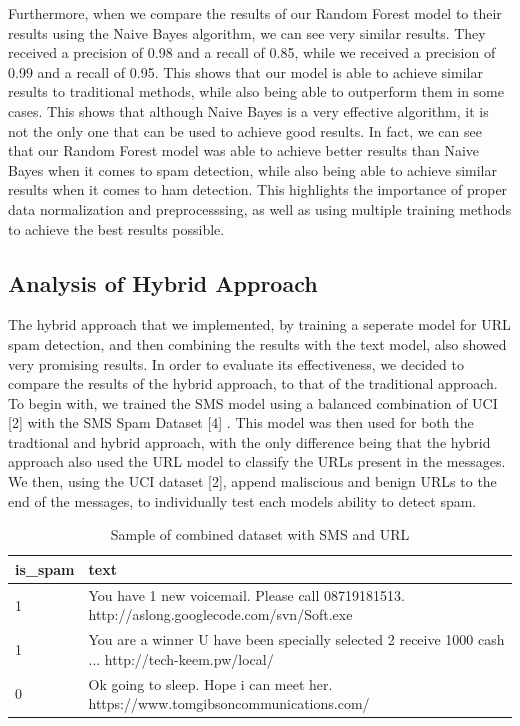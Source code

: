\documentclass{article}
\begin{document}
\noindent
Furthermore, when we compare the results of our Random Forest model to their results using the Naive Bayes algorithm, we can see very similar results. They received a precision of 0.98 and a recall of 0.85, while we received a precision of 0.99 and a recall of 0.95. This shows that our model is able to achieve similar results to traditional methods, while also being able to outperform them in some cases. This shows that although Naive Bayes is a very effective algorithm, it is not the only one that can be used to achieve good results. In fact, we can see that our Random Forest model was able to achieve better results than Naive Bayes when it comes to spam detection, while also being able to achieve similar results when it comes to ham detection. This highlights the importance of proper data normalization and preprocesssing, as well as using multiple training methods to achieve the best results possible.

\subsection{Analysis of Hybrid Approach}

\noindent
The hybrid approach that we implemented, by training a seperate model for URL spam detection, and then combining the results with the text model, also showed very promising results. In order to evaluate its effectiveness, we decided to compare the results of the hybrid approach, to that of the traditional approach. To begin with, we trained the SMS model using a balanced combination of UCI [2] with the SMS Spam Dataset [4] . This model was then used for both the tradtional and hybrid approach, with the only difference being that the hybrid approach also used the URL model to classify the URLs present in the messages. We then, using the UCI dataset [2], append maliscious and benign URLs to the end of the messages, to individually test each models ability to detect spam. 


\begin{table}[htbp]
    \centering
    \caption{Sample of combined dataset with SMS and URL}
    \begin{tabular}{ll}
    \toprule
    is\_spam & text \\
    \midrule
    1 & You have 1 new voicemail. Please call 08719181513. http://aslong.googlecode.com/svn/Soft.exe \\
    1 & You are a winner U have been specially selected 2 receive 1000 cash ... http://tech-keem.pw/local/ \\ 
    0 & Ok going to sleep. Hope i can meet her. https://www.tomgibsoncommunications.com/ \\
    \bottomrule
    \end{tabular}
    \label{tab:csv_sample}
\end{table}
\end{document}
